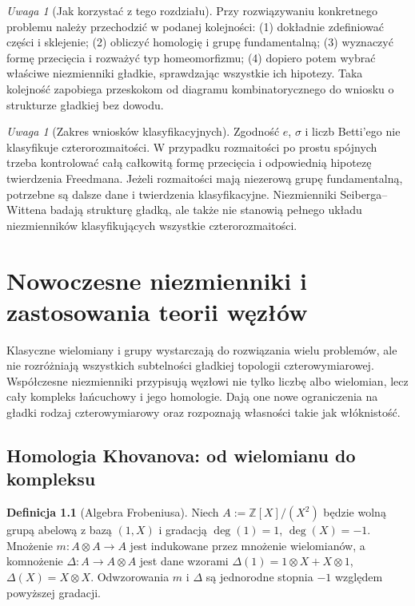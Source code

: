 \documentclass[11pt,a4paper]{report}
\numberwithin{equation}{section}
\theoremstyle{plain}
\theoremstyle{definition}
\newtheorem{definicja}[twierdzenie]{Definicja}
\theoremstyle{remark}
\newtheorem{uwaga}[twierdzenie]{Uwaga}
\begin{document}
\begin{uwaga}[Jak korzystać z tego rozdziału]
Przy rozwiązywaniu konkretnego problemu należy przechodzić
w podanej kolejności: (1) dokładnie zdefiniować części i sklejenie;
(2) obliczyć homologię i grupę fundamentalną;
(3) wyznaczyć formę przecięcia i rozważyć typ homeomorfizmu;
(4) dopiero potem wybrać właściwe niezmienniki gładkie,
sprawdzając wszystkie ich hipotezy. Taka kolejność zapobiega
przeskokom od diagramu kombinatorycznego do wniosku o strukturze
gładkiej bez dowodu.
\end{uwaga}


\begin{uwaga}[Zakres wniosków klasyfikacyjnych]
Zgodność $e$, $\sigma$ i liczb Betti'ego nie klasyfikuje
czterorozmaitości. W przypadku rozmaitości po prostu
spójnych trzeba kontrolować całą całkowitą formę
przecięcia i odpowiednią hipotezę twierdzenia Freedmana.
Jeżeli rozmaitości mają niezerową grupę fundamentalną,
potrzebne są dalsze dane i twierdzenia klasyfikacyjne.
Niezmienniki Seiberga--Wittena badają strukturę gładką,
ale także nie stanowią pełnego układu niezmienników
klasyfikujących wszystkie czterorozmaitości.
\end{uwaga}

\chapter{Nowoczesne niezmienniki i zastosowania teorii węzłów}
\label{ch:kt-nowoczesne}

Klasyczne wielomiany i grupy wystarczają do rozwiązania wielu
problemów, ale nie rozróżniają wszystkich subtelności gładkiej
topologii czterowymiarowej. Współczesne niezmienniki przypisują
węzłowi nie tylko liczbę albo wielomian, lecz cały kompleks
łańcuchowy i jego homologie. Dają one nowe ograniczenia
na gładki rodzaj czterowymiarowy oraz rozpoznają własności
takie jak włóknistość.

\section{Homologia Khovanova: od wielomianu do kompleksu}
\label{sec:kt-khovanov}

\begin{definicja}[Algebra Frobeniusa]
Niech $A:=\mathbb Z[X]/(X^2)$ będzie wolną grupą abelową
z bazą $(1,X)$ i gradacją $\deg(1)=1$, $\deg(X)=-1$.
Mnożenie $m\colon A\otimes A\to A$ jest indukowane przez
mnożenie wielomianów, a komnożenie
$\Delta\colon A\to A\otimes A$ jest dane wzorami
$\Delta(1)=1\otimes X+X\otimes1$,
$\Delta(X)=X\otimes X$. Odwzorowania $m$ i $\Delta$
są jednorodne stopnia $-1$ względem powyższej gradacji.
\end{definicja}
\end{document}
